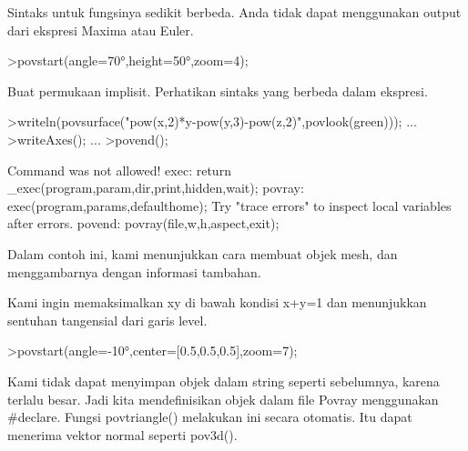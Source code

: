 \documentclass{article}
\begin{document}
\begin{eulernotebook}
\begin{eulercomment}
\begin{eulercomment}
\begin{eulercomment}
Sintaks untuk fungsinya sedikit berbeda. Anda tidak dapat menggunakan
output dari ekspresi Maxima atau Euler.
\end{eulercomment}
\begin{eulerprompt}
>povstart(angle=70°,height=50°,zoom=4);
\end{eulerprompt}
\begin{eulercomment}
Buat permukaan implisit. Perhatikan sintaks yang berbeda dalam
ekspresi.
\end{eulercomment}
\begin{eulerprompt}
>writeln(povsurface("pow(x,2)*y-pow(y,3)-pow(z,2)",povlook(green))); ...
>writeAxes(); ...
>povend();
\end{eulerprompt}
\begin{euleroutput}
  Command was not allowed!
  exec:
      return _exec(program,param,dir,print,hidden,wait);
  povray:
      exec(program,params,defaulthome);
  Try "trace errors" to inspect local variables after errors.
  povend:
      povray(file,w,h,aspect,exit); 
\end{euleroutput}
\begin{eulercomment}
Dalam contoh ini, kami menunjukkan cara membuat objek mesh, dan
menggambarnya dengan informasi tambahan.

Kami ingin memaksimalkan xy di bawah kondisi x+y=1 dan menunjukkan
sentuhan tangensial dari garis level.
\end{eulercomment}
\begin{eulerprompt}
>povstart(angle=-10°,center=[0.5,0.5,0.5],zoom=7);
\end{eulerprompt}
\begin{eulercomment}
Kami tidak dapat menyimpan objek dalam string seperti sebelumnya,
karena terlalu besar. Jadi kita mendefinisikan objek dalam file Povray
menggunakan #declare. Fungsi povtriangle() melakukan ini secara
otomatis. Itu dapat menerima vektor normal seperti pov3d().


\end{eulercomment}
\end{eulercomment}
\end{eulercomment}
\end{eulernotebook}
\end{document}
